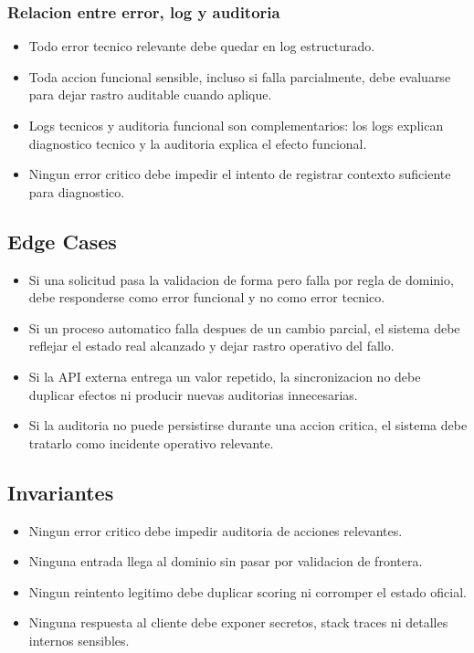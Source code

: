 \subsubsection{Relacion entre error, log y auditoria}

\begin{itemize}
  \item Todo error tecnico relevante debe quedar en log estructurado.
  \item Toda accion funcional sensible, incluso si falla parcialmente, debe evaluarse para dejar rastro auditable cuando aplique.
  \item Logs tecnicos y auditoria funcional son complementarios: los logs explican diagnostico tecnico y la auditoria explica el efecto funcional.
  \item Ningun error critico debe impedir el intento de registrar contexto suficiente para diagnostico.
\end{itemize}

\subsection{Edge Cases}

\begin{itemize}
  \item Si una solicitud pasa la validacion de forma pero falla por regla de dominio, debe responderse como error funcional y no como error tecnico.
  \item Si un proceso automatico falla despues de un cambio parcial, el sistema debe reflejar el estado real alcanzado y dejar rastro operativo del fallo.
  \item Si la API externa entrega un valor repetido, la sincronizacion no debe duplicar efectos ni producir nuevas auditorias innecesarias.
  \item Si la auditoria no puede persistirse durante una accion critica, el sistema debe tratarlo como incidente operativo relevante.
\end{itemize}

\subsection{Invariantes}

\begin{itemize}
  \item Ningun error critico debe impedir auditoria de acciones relevantes.
  \item Ninguna entrada llega al dominio sin pasar por validacion de frontera.
  \item Ningun reintento legitimo debe duplicar scoring ni corromper el estado oficial.
  \item Ninguna respuesta al cliente debe exponer secretos, stack traces ni detalles internos sensibles.
\end{itemize}


